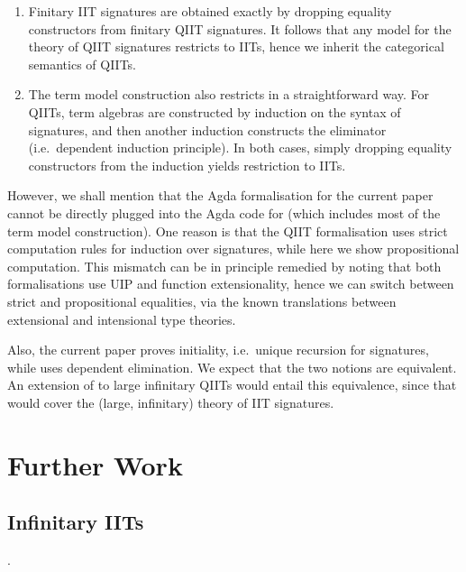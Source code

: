 \documentclass[a4paper,UKenglish,cleveref, autoref]{lipics-v2019}
\begin{document}
\begin{enumerate}
\item
  Finitary IIT signatures are obtained exactly by dropping equality constructors from
  finitary QIIT signatures. It follows that any model for the theory of QIIT signatures
  restricts to IITs, hence we inherit the categorical semantics of QIITs.
\item
  The term model construction also restricts in a straightforward way. For QIITs,
  term algebras are constructed by induction on the syntax of signatures, and
  then another induction constructs the eliminator (i.e.\ dependent induction
  principle). In both cases, simply dropping equality constructors from the
  induction yields restriction to IITs.
\end{enumerate}

However, we shall mention that the Agda formalisation for the current paper
cannot be directly plugged into the Agda code for
\cite{Kaposi:2019:CQI:3302515.3290315} (which includes most of the term model
construction). One reason is that the QIIT formalisation uses strict computation
rules for induction over signatures, while here we show propositional
computation. This mismatch can be in principle remedied by noting that both
formalisations use UIP and function extensionality, hence we can switch between
strict and propositional equalities, via the known translations between
extensional and intensional type
theories\cite{hofmann95extensional,winterhalter2019eliminating}.

Also, the current paper proves initiality, i.e.\ unique recursion for
signatures, while \cite{Kaposi:2019:CQI:3302515.3290315} uses dependent
elimination. We expect that the two notions are equivalent. An extension of
\cite{Kaposi:2019:CQI:3302515.3290315} to large infinitary QIITs would entail
this equivalence, since that would cover the (large, infinitary) theory of IIT
signatures.


\section{Further Work}

\subsection{Infinitary IITs}.
\end{document}
